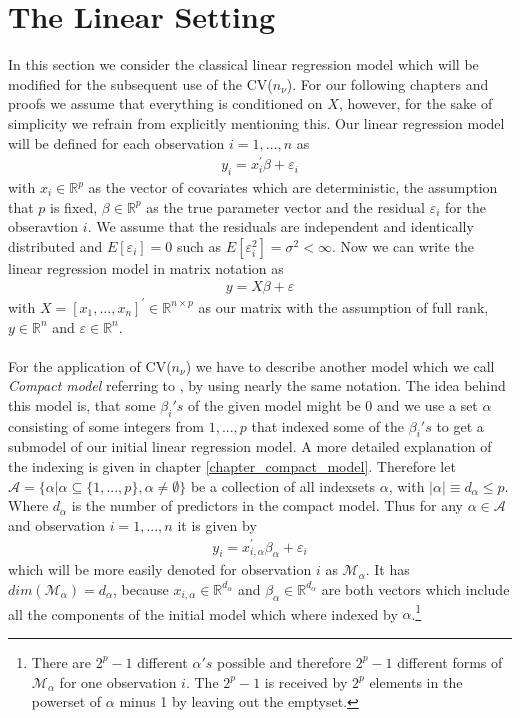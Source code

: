 \documentclass[Research_Module_ES.tex]{subfiles}
\begin{document}
\section{The Linear Setting}
In this section we consider the classical linear regression model which will be modified for the subsequent use of the CV($n_\nu$). For our following chapters and proofs we assume that everything is conditioned on $X$, however, for the sake of simplicity we refrain from explicitly mentioning this. Our linear regression model will be defined for each observation $i=1,...,n$ as
\begin{align*}
y_i=x_i^\prime\beta+\varepsilon_i
\end{align*}
with $x_i\in\mathbb{R}^p$ as the vector of covariates which are deterministic, the assumption that $p$ is fixed, $\beta\in\mathbb{R}^p$ as the true parameter vector and the residual $\varepsilon_i$ for the obseravtion $i$.
We assume that the residuals are independent and identically distributed and $E[\varepsilon_i]=0$ such as $E[\varepsilon_i^2]=\sigma^2<\infty$. Now we can write the linear regression model in matrix notation as
\begin{align*}
	y=X\beta+\varepsilon
\end{align*}
with $X=[x_1,...,x_n]^\prime\in\mathbb{R}^{n\times p}$ as our matrix with the assumption of full rank, $y\in\mathbb{R}^{n}$ and $\varepsilon\in\mathbb{R}^{n}$.
\\\\
For the application of CV($n_\nu$) we have to describe another model which we call \textit{Compact model} referring to \cite{shao}, by using nearly the same notation. The idea behind this model is, that some $\beta_i's$ of the given model might be $0$ and we use a set $\alpha$ consisting of some integers from $1,...,p$ that indexed some of the $\beta_i's$ to get a submodel of our initial linear regression model. A more detailed explanation of the indexing is given in chapter \ref{chapter_compact_model}. Therefore let 
$\mathcal{A}=\{\alpha|\alpha\subseteq\{1,...,p\},\alpha\neq\emptyset\}$ be a collection of all indexsets $\alpha$, with 
$|\alpha|\equiv d_\alpha\leq p$. Where $d_\alpha$ is the number of predictors in the compact model. Thus for any $\alpha\in\mathcal{A}$ and observation $i=1,...,n$ it is given by
\begin{align*}
	y_i=x_{i,\alpha}^\prime\beta_\alpha+\varepsilon_i
\end{align*}
which will be more easily denoted for observation $i$ as $\mathcal{M}_\alpha$. It has  $dim(\mathcal{M}_\alpha)=d_\alpha$, because $x_{i,\alpha}\in\mathbb{R}^{d_\alpha}$ and $\beta_\alpha\in\mathbb{R}^{d_\alpha}$ are both vectors which include all the components of the initial model which where indexed by $\alpha$.\footnote{There are $2^p-1$ different $\alpha's$ possible and therefore $2^p-1$ different forms of $\mathcal{M}_\alpha$ for one observation $i$. The $2^p-1$ is received by $2^p$ elements in the powerset of $\alpha$ minus 1 by leaving out the emptyset.}
\end{document}
